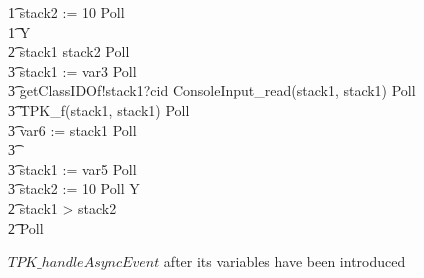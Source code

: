 \begin{figure}[tp!]
{\begin{circusaction}
    \t1 stack2 := 10 \circseq Poll \circseq \\
    \t1 \circmu Y \circspot \\
    \t2 \circif stack1 \leq stack2 \circthen Poll \circseq \\
    \t3 stack1 := var3 \circseq Poll \circseq \\
    \t3 getClassIDOf!stack1?cid \then ConsoleInput\_read(stack1, stack1) \circseq Poll \circseq \\
    \t3 TPK\_f(stack1, stack1) \circseq Poll \circseq \\
    \t3 var6 := stack1 \circseq Poll \circseq \\
    \t3 {} \cdots {} \\
    \t3 stack1 := var5 \circseq Poll \circseq \\
    \t3 stack2 := 10 \circseq Poll \circseq Y \\
    \t2 {} \circelse stack1 > stack2 \circthen \Skip \\
    \t2 \circfi \circseq Poll
  \end{circusaction}
  }
  \caption{$TPK\_handleAsyncEvent$ after its variables have been introduced}
  \label{efs-introduce-variables-mid-example-figure}
\end{figure}

